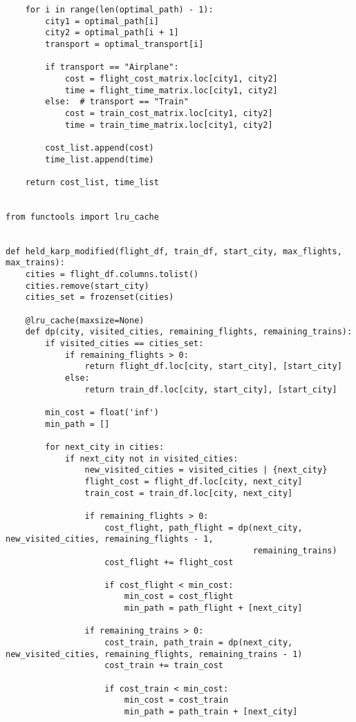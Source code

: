 \documentclass{article} %
\begin{document}
\begin{lstlisting}
    for i in range(len(optimal_path) - 1):
        city1 = optimal_path[i]
        city2 = optimal_path[i + 1]
        transport = optimal_transport[i]

        if transport == "Airplane":
            cost = flight_cost_matrix.loc[city1, city2]
            time = flight_time_matrix.loc[city1, city2]
        else:  # transport == "Train"
            cost = train_cost_matrix.loc[city1, city2]
            time = train_time_matrix.loc[city1, city2]

        cost_list.append(cost)
        time_list.append(time)

    return cost_list, time_list


from functools import lru_cache


def held_karp_modified(flight_df, train_df, start_city, max_flights, max_trains):
    cities = flight_df.columns.tolist()
    cities.remove(start_city)
    cities_set = frozenset(cities)

    @lru_cache(maxsize=None)
    def dp(city, visited_cities, remaining_flights, remaining_trains):
        if visited_cities == cities_set:
            if remaining_flights > 0:
                return flight_df.loc[city, start_city], [start_city]
            else:
                return train_df.loc[city, start_city], [start_city]

        min_cost = float('inf')
        min_path = []

        for next_city in cities:
            if next_city not in visited_cities:
                new_visited_cities = visited_cities | {next_city}
                flight_cost = flight_df.loc[city, next_city]
                train_cost = train_df.loc[city, next_city]

                if remaining_flights > 0:
                    cost_flight, path_flight = dp(next_city, new_visited_cities, remaining_flights - 1,
                                                  remaining_trains)
                    cost_flight += flight_cost

                    if cost_flight < min_cost:
                        min_cost = cost_flight
                        min_path = path_flight + [next_city]

                if remaining_trains > 0:
                    cost_train, path_train = dp(next_city, new_visited_cities, remaining_flights, remaining_trains - 1)
                    cost_train += train_cost

                    if cost_train < min_cost:
                        min_cost = cost_train
                        min_path = path_train + [next_city]


\end{lstlisting}
\end{document}
